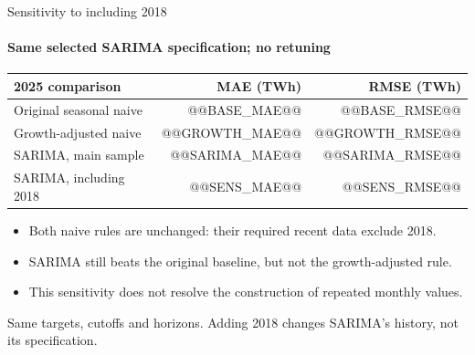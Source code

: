 \documentclass[aspectratio=169,10pt]{beamer}
\newcommand{\Source}[1]{\par\vfill{\fontsize{6.5}{7.5}\selectfont\color{black!65}#1\par}}
\begin{document}
\begin{frame}[t]{Sensitivity to including 2018}
\framesubtitle{Same selected SARIMA specification; no retuning}
\begin{center}
\begin{tabular}{lrr}\toprule
2025 comparison & MAE (TWh) & RMSE (TWh)\\\midrule
Original seasonal naive & @@BASE_MAE@@ & @@BASE_RMSE@@\\
Growth-adjusted naive & @@GROWTH_MAE@@ & @@GROWTH_RMSE@@\\
SARIMA, main sample & @@SARIMA_MAE@@ & @@SARIMA_RMSE@@\\
SARIMA, including 2018 & @@SENS_MAE@@ & @@SENS_RMSE@@\\\bottomrule
\end{tabular}
\end{center}
\begin{itemize}
\item Both naive rules are unchanged: their required recent data exclude 2018.
\item SARIMA still beats the original baseline, but not the growth-adjusted rule.
\item This sensitivity does not resolve the construction of repeated monthly values.
\end{itemize}
\Source{Same targets, cutoffs and horizons. Adding 2018 changes SARIMA's history, not its specification.}
\end{frame}
\end{document}
